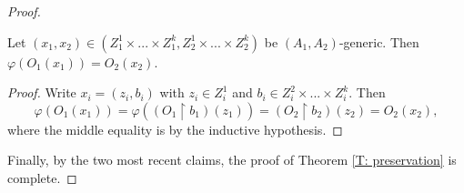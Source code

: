 \documentclass[10pt,a4paper]{amsart}
\begin{document}
\begin{proof}
    \begin{claim} Let $(x_1,x_2)\in(Z_1^1\times...\times Z_1^k,Z_2^1\times...\times Z_2^k)$ be $(A_1,A_2)$-generic. Then $\varphi(O_1(x_1))=O_2(x_2)$.
    \end{claim}
    \begin{proof}
        Write $x_i=(z_i,b_i)$ with $z_i\in Z_i^1$ and $b_i\in Z_i^2\times...\times Z_i^k$. Then $$\varphi(O_1(x_1))=\varphi((O_1\restriction b_1)(z_1))=(O_2\restriction b_2)(z_2)=O_2(x_2),$$ where the middle equality is by the inductive hypothesis.
    \end{proof}

    Finally, by the two most recent claims, the proof of Theorem \ref{T: preservation} is complete.
\end{proof}
\end{document}
